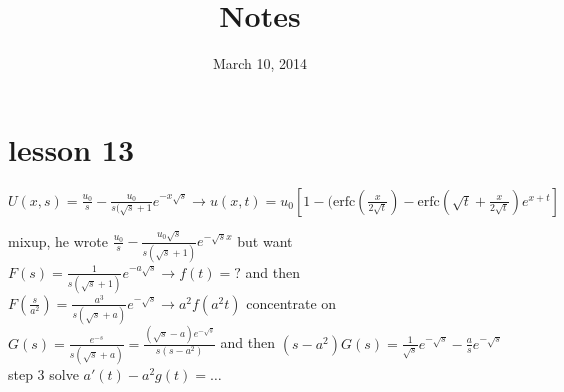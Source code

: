 \documentclass{article}
\begin{document}
\title{Notes}
\date{March 10, 2014}
\maketitle
\section*{lesson 13}
$U(x,s)=\frac{u_0}{s}-\frac{u_0}{s(\sqrt{s}+1}e^{-x\sqrt{s}}\to u(x,t)=u_0\left[1-(\text{erfc}(\frac{x}{2\sqrt{t}})-\text{erfc}(\sqrt{t}+\frac{x}{2\sqrt{t}})e^{x+t}\right]$

mixup, he wrote $\frac{u_0}{s}-\frac{u_0\sqrt{s}}{s(\sqrt{s}+1)}e^{-\sqrt{s}x}$ but want $F(s)=\frac{1}{s(\sqrt{s}+1)}e^{-a\sqrt{s}}\to f(t)=?$ and then $F(\frac{s}{a^2})=\frac{a^3}{s(\sqrt{s}+a)}e^{-\sqrt{s}}\to a^2f(a^2t)$ concentrate on $G(s)=\frac{e^{-s}}{s(\sqrt{s}+a)}=\frac{(\sqrt{s}-a)e^{-\sqrt{s}}}{s(s-a^2)}$ and then $(s-a^2)G(s)=\frac{1}{\sqrt{s}}e^{-\sqrt{s}}-\frac{a}{s}e^{-\sqrt{s}}$ step 3 solve $a'(t)-a^2g(t)=\dots$
\end{document}
